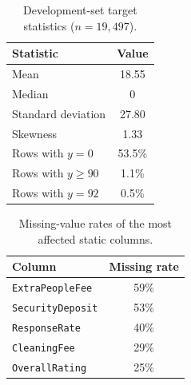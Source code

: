 \documentclass[journal]{IEEEtran}
\begin{document}
\begin{table}[!t]
\caption{Development-set target statistics ($n=19{,}497$).}
\label{tab:targetstats}
\centering
\begin{tabular}{lc}
\toprule
Statistic & Value \\
\midrule
Mean & 18.55 \\
Median & 0 \\
Standard deviation & 27.80 \\
Skewness & 1.33 \\
Rows with $y=0$ & 53.5\% \\
Rows with $y\ge 90$ & 1.1\% \\
Rows with $y=92$ & 0.5\% \\
\bottomrule
\end{tabular}
\end{table}

\begin{table}[!t]
\caption{Missing-value rates of the most affected static columns.}
\label{tab:missing}
\centering
\begin{tabular}{lc}
\toprule
Column & Missing rate \\
\midrule
\texttt{ExtraPeopleFee} & 59\% \\
\texttt{SecurityDeposit} & 53\% \\
\texttt{ResponseRate} & 40\% \\
\texttt{CleaningFee} & 29\% \\
\texttt{OverallRating} & 25\% \\
\bottomrule
\end{tabular}
\end{table}
\end{document}
